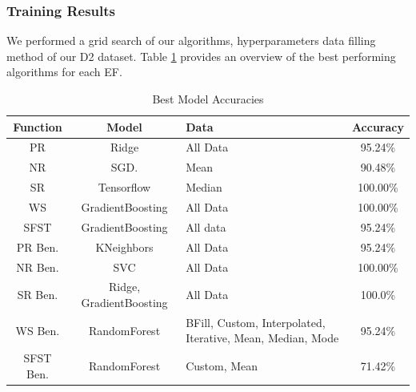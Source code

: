 \documentclass[12pt,letterpaper]{article}
\begin{document}
\subsubsection{Training Results}\label{sec:class_specific_results}
We performed a grid search of our algorithms, hyperparameters data filling method of our D2 dataset.
Table \ref{tab_class_specific:model_accuracies_best} provides an overview of the best performing algorithms for each \ac{EF}.

\begin{table}[H]
\centering
\begin{tabular}{|c|c|p{4cm}|c|}
\hline
\textbf{Function} & \textbf{Model} & \textbf{Data} & \textbf{Accuracy} \\
\hline
PR & Ridge & All Data & 95.24\% \\
\hline
NR    & SGD. & Mean & 90.48\% \\
\hline
SR    & Tensorflow & Median & 100.00\% \\
\hline
WS    & GradientBoosting & All Data & 100.00\% \\
\hline
SFST  & GradientBoosting & All data & 95.24\% \\
\hline
PR Ben. & KNeighbors & All Data & 95.24\% \\
\hline
NR Ben. & SVC & All Data & 100.00\% \\
\hline
SR Ben.& Ridge, GradientBoosting & All Data & 100.0\% \\
\hline
WS Ben. & RandomForest & BFill, Custom, Interpolated, Iterative, Mean, Median, Mode & 95.24\% \\
\hline
SFST Ben. &  RandomForest & Custom, Mean & 71.42\% \\
\hline
\end{tabular}
\caption{Best Model Accuracies}
\label{tab_class_specific:model_accuracies_best}
\end{table}
\end{document}

